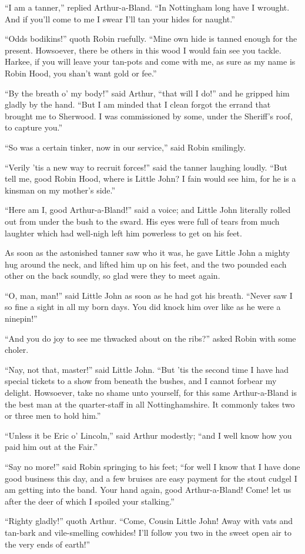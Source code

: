 ``I am a tanner,'' replied Arthur-a-Bland. ``In Nottingham long have I
wrought. And if you'll come to me I swear I'll tan your hides for
naught.''

``Odds bodikins!'' quoth Robin ruefully. ``Mine own hide is tanned
enough for the present. Howsoever, there be others in this wood I would
fain see you tackle. Harkee, if you will leave your tan-pots and come
with me, as sure as my name is Robin Hood, you shan't want gold or
fee.''

``By the breath o' my body!'' said Arthur, ``that will I do!'' and he
gripped him gladly by the hand. ``But I am minded that I clean forgot
the errand that brought me to Sherwood. I was commissioned by some,
under the Sheriff's roof, to capture you.''

``So was a certain tinker, now in our service,'' said Robin smilingly.

``Verily 'tis a new way to recruit forces!'' said the tanner laughing
loudly. ``But tell me, good Robin Hood, where is Little John? I fain
would see him, for he is a kinsman on my mother's side.''

``Here am I, good Arthur-a-Bland!'' said a voice; and Little John
literally rolled out from under the bush to the sward. His eyes were
full of tears from much laughter which had well-nigh left him powerless
to get on his feet.

As soon as the astonished tanner saw who it was, he gave Little John a
mighty hug around the neck, and lifted him up on his feet, and the two
pounded each other on the back soundly, so glad were they to meet again.

``O, man, man!'' said Little John as soon as he had got his breath.
``Never saw I so fine a sight in all my born days. You did knock him
over like as he were a ninepin!''

``And you do joy to see me thwacked about on the ribs?'' asked Robin
with some choler.

``Nay, not that, master!'' said Little John. ``But 'tis the second time
I have had special tickets to a show from beneath the bushes, and I
cannot forbear my delight. Howsoever, take no shame unto yourself, for
this same Arthur-a-Bland is the best man at the quarter-staff in all
Nottinghamshire. It commonly takes two or three men to hold him.''

``Unless it be Eric o' Lincoln,'' said Arthur modestly; ``and I well
know how you paid him out at the Fair.''

``Say no more!'' said Robin springing to his feet; ``for well I know
that I have done good business this day, and a few bruises are easy
payment for the stout cudgel I am getting into the band. Your hand
again, good Arthur-a-Bland! Come! let us after the deer of which I
spoiled your stalking.''

``Righty gladly!'' quoth Arthur. ``Come, Cousin Little John! Away with
vats and tan-bark and vile-smelling cowhides! I'll follow you two in the
sweet open air to the very ends of earth!''
